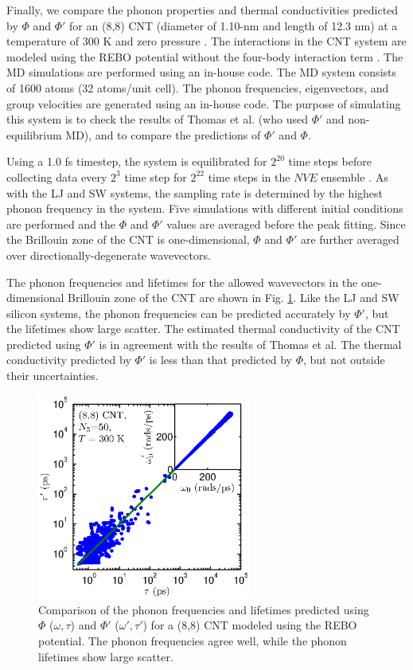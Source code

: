 \documentclass[12pt,twocolumn,iop]{/usr/share/texmf-texlive/tex/latex/iop/iopart}[/usr/share/texmf-texlive/tex/latex/iop/]
\begin{document}
Finally, we compare the phonon properties and thermal conductivities predicted by $\Phi$ and $\Phi'$ for an (8,8) CNT (diameter of 1.10-nm and length of 12.3 nm) at a temperature of $300$ K and zero pressure \cite{thomas2010c}. The interactions in the CNT system are modeled using the REBO potential without the four-body interaction term \cite{brenner2002}. The MD simulations are performed using an in-house code. The MD system consists of 1600 atoms (32 atoms/unit cell). The phonon frequencies, eigenvectors, and group velocities are generated using an in-house code. The purpose of simulating this system is to check the results of Thomas et al.\cite{thomas2010c} (who used $\Phi'$ and non-equilibrium MD), and to compare the predictions of $\Phi'$ and $\Phi$.

Using a 1.0 fs timestep, the system is equilibrated for $2^{20}$ time steps before collecting data every $2^3$ time step for $2^{22}$ time steps in the $NVE$ ensemble \cite{mcquarrie2000}. As with the LJ and SW systems, the sampling rate is determined by the highest phonon frequency in the system. Five simulations with different initial conditions are performed and the $\Phi$ and $\Phi'$ values are averaged before the peak fitting. Since the Brillouin zone of the CNT is one-dimensional, $\Phi$ and $\Phi'$ are further averaged over directionally-degenerate wavevectors.

The phonon frequencies and lifetimes for the allowed wavevectors in the one-dimensional Brillouin zone of the CNT are shown in Fig. \ref{F:FREQ_LIFE_CNT}. Like the LJ and SW silicon systems, the phonon frequencies can be predicted accurately by $\Phi'$, but the lifetimes show large scatter. The estimated thermal conductivity of the CNT predicted using $\Phi'$ is in agreement with the results of Thomas et al.\cite{thomas2010c} The thermal conductivity predicted by $\Phi'$ is less than that predicted by $\Phi$, but not outside their uncertainties.

\begin{figure}
\begin{center}
\includegraphics[angle=0,width=70.0mm]{figure5.eps}
\vspace*{0mm}
\end{center}
\caption{\label{F:FREQ_LIFE_CNT} Comparison of the phonon frequencies and lifetimes predicted using $\Phi$ ($\omega,\tau$) and $\Phi'$ ($\omega',\tau'$) for a (8,8) CNT modeled using the REBO potential. The phonon frequencies agree well, while the phonon lifetimes show large scatter.}
\end{figure}
\end{document}
